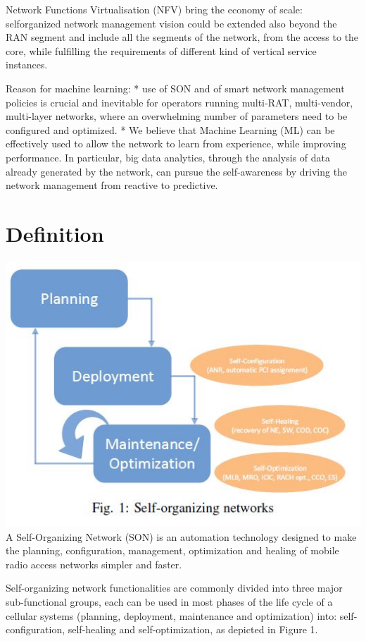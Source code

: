 \documentclass[12pt]{article}
\begin{document}
Network Functions Virtualisation (NFV) bring the economy of scale: selforganized
network management vision could be extended also
beyond the RAN segment and include all the segments
of the network, from the access to the core, while fulfilling
the requirements of different kind of vertical service instances.

Reason for machine learning:
* use of SON and of
smart network management policies is crucial and inevitable
for operators running multi-RAT, multi-vendor, multi-layer
networks, where an overwhelming number of parameters need
to be configured and optimized.
* We believe that Machine Learning (ML) can be effectively
used to allow the network to learn from experience, while improving
performance. In particular, big data analytics, through
the analysis of data already generated by the network, can
pursue the self-awareness by driving the network management
from reactive to predictive.
\section{Definition}

\includegraphics[]{fig1.jpg}
A Self-Organizing Network (SON) is an automation technology designed to make the planning, configuration, management, optimization and healing of mobile radio access networks simpler and faster.

Self-organizing network functionalities are commonly divided into three major sub-functional groups, each can be used in most phases of the life cycle of a cellular systems (planning, deployment,
maintenance and optimization) into: self-configuration,
self-healing and self-optimization, as depicted in Figure 1.
\end{document}
